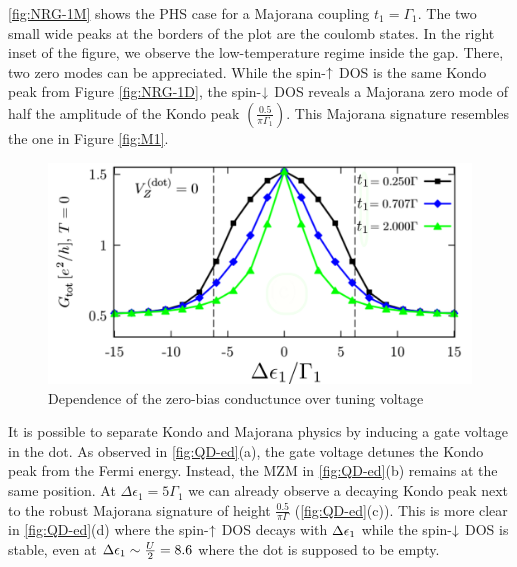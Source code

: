  \ref{fig:NRG-1M} shows the PHS case for a Majorana coupling $t_1=\Gamma_1$. The two small wide peaks at the borders of the plot are the coulomb states. In the right inset of the figure, we observe the low-temperature regime inside the gap. There, two zero modes can be appreciated.  While the spin-$\uparrow$ DOS is the same Kondo peak from Figure \ref{fig:NRG-1D}, the spin-$\downarrow$ DOS reveals a Majorana zero mode of half the amplitude of the Kondo peak $\left(\frac{0.5}{\pi\Gamma_1}\right)$.  This  Majorana signature resembles the one in Figure \ref{fig:M1}.
 \begin{figure}[H]
 \centering
 \includegraphics[scale=0.48]{IMAGES/Majorana/Luis.png}
 \caption{\label{fig:Luis}Dependence of the zero-bias conductunce over tuning voltage \protect{}}
 \end{figure}


 It is possible to separate Kondo and Majorana physics by inducing a gate voltage in the dot. As observed in \ref{fig:QD-ed}(a), the gate voltage detunes the Kondo peak from the Fermi energy. Instead, the MZM in \ref{fig:QD-ed}(b) remains at the same position. At $\Delta \epsilon_1 = 5\Gamma_1$ we can already observe a decaying Kondo peak next to the robust Majorana signature of height $\frac{0.5}{\pi\Gamma}$ (\ref{fig:QD-ed}(c)). This is more clear in \ref{fig:QD-ed}(d) where the spin-$\uparrow$ DOS decays with $\Delta \epsilon_1$ while the spin-$\downarrow$ DOS is stable, even at $\Delta \epsilon_1 \sim \frac{U}{2} = 8.6$ where the dot is supposed to be empty. 




